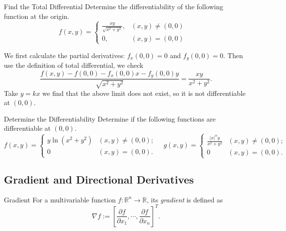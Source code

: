 \begin{example}{Find the Total Differential}{}
  Determine the differentiability of the following function at the origin.
  \begin{equation}
    f(x,y)=\begin{cases}\frac{xy}{\sqrt{x^2+y^2}},&(x,y)\neq(0,0)\\0,&(x,y)=(0,0)\end{cases} \quad
  \end{equation}
\end{example}

\begin{solution}
  We first calculate the partial derivatives: $f_x(0, 0) = 0$ and $f_y(0, 0) = 0$.
  Then use the definition of total differential, we check
  \begin{equation}
    \frac{f(x, y) - f(0, 0) - f_x(0, 0) x - f_y(0, 0)y}{\sqrt{x^2 + y^2}}
    = \frac{xy}{x^2 + y^2}.
  \end{equation}
  Take $y = kx$ we find that the above limit does not exist,
  so it is not differentiable at $(0, 0)$.
\end{solution}

\begin{example}{Determine the Differentiability}{}
  Determine if the following functions are differentiable at $(0, 0)$.
  \begin{equation}
    f(x, y) =
    \begin{cases}
      y \ln (x^2 + y^2) & (x, y) \neq (0, 0);\\
      0 & (x, y) = (0, 0).
    \end{cases}
    \quad
    g(x, y) =
    \begin{cases}
      \frac{|x|^{\alpha} y}{x^2 + y^2} & (x, y) \neq (0, 0);\\
      0 & (x, y) = (0, 0).
    \end{cases}
  \end{equation}
\end{example}

\begin{solution}
  
\end{solution}

\subsection{Gradient and Directional Derivatives}

\begin{definition}{Gradient}{}
  For a multivariable function $f: \mathbb{R}^n \rightarrow \mathbb{R}$,
  its \emph{gradient} is defined as
  \begin{equation}
    \nabla f := \left[ \frac{\partial f}{\partial x_1},\cdots,\frac{\partial f}{\partial x_n} \right]^T.
  \end{equation}
\end{definition}

